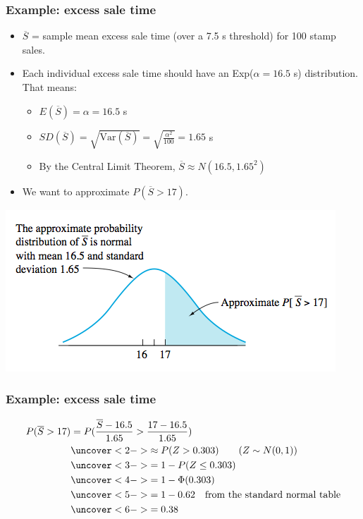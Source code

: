 \documentclass[handout]{beamer}\usepackage[]{graphicx}\usepackage[]{color}
\providecommand{\ov}[1]{\overline{#1}}
\numberwithin{equation}{section}
\begin{document}
\begin{frame}
\frametitle{Example: excess sale time}
\begin{itemize}
\pause \item $\ov{S}$ = sample mean excess sale time (over a 7.5 s threshold) for 100 stamp sales.
\pause \item Each individual excess sale time should have an Exp($\alpha = 16.5$ s) distribution. That means:
\begin{itemize}
\pause \item $E(\ov{S}) = \alpha = 16.5$ s
\pause \item $SD(\ov{S}) = \sqrt{\text{Var}(\ov{S})} = \sqrt{\frac{\alpha^2}{100}} = 1.65$ s
\pause \item By the Central Limit Theorem, $\ov{S} \approx N(16.5, 1.65^2)$
\end{itemize}
\pause \item We want to approximate $P(\ov{S} > 17)$.
\end{itemize}
 \includegraphics{../../fig/salesnorm.png}
\end{frame}


\begin{frame}
\frametitle{Example: excess sale time}
\begin{align*}
P(\ov{S} > 17) &= P(\frac{\ov{S} - 16.5}{1.65} > \frac{17 - 16.5}{1.65})\\
&\uncover<2->{\approx P(Z > 0.303) \qquad (Z \sim N(0,1))} \\
&\uncover<3->{= 1 - P(Z \le 0.303)} \\
& \uncover<4->{= 1 - \Phi(0.303)} \\
&\uncover<5->{ = 1 - 0.62 \quad \text{from the standard normal table} }\\
&\uncover<6->{= 0.38}
\end{align*}
\end{frame}
\end{document}
